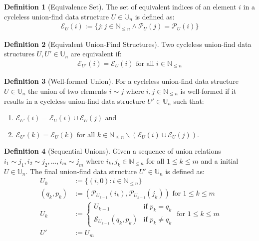 \documentclass[a4paper,12pt]{article}
\theoremstyle{definition}
\newtheorem{definition}{Definition}[section]
\begin{document}
\begin{definition}[Equivalence Set]
    The set of equivalent indices of an element $i$ in a cycleless union-find
    data structure $U \in \mathbb{U}_n$ is defined as:
    \begin{align*}
        \mathcal{E}_U(i) := \{j : j \in \mathbb{N}_{\leq n} \land \mathcal{P}_U(j) = \mathcal{P}_U(i)\}
    \end{align*}
\end{definition}

\begin{definition}[Equivalent Union-Find Structures]
    Two cycleless union-find data structures $U, U' \in \mathbb{U}_n$ are
    equivalent if:
    \begin{align*}
        \mathcal{E}_{U'}(i) = \mathcal{E}_U(i) \text{ for all } i \in \mathbb{N}_{\leq n}
    \end{align*}
\end{definition}

\begin{definition}[Well-formed Union]
    For a cycleless union-find data structure $U \in \mathbb{U}_n$ the union of
    two elements $i \sim j$ where $i, j \in \mathbb{N}_{\leq n}$ is well-formed
    if it results in a cycleless union-find data structure $U' \in \mathbb{U}_n$
    such that:
    \begin{enumerate}
        \item $\mathcal{E}_{U'}(i) = \mathcal{E}_U(i) \cup \mathcal{E}_U(j)$ and
        \item $\mathcal{E}_{U'}(k) = \mathcal{E}_U(k) \text{ for all } k \in
        \mathbb{N}_{\leq n} \backslash (\mathcal{E}_U(i) \cup \mathcal{E}_U(j))$.
    \end{enumerate}
\end{definition}

\begin{definition}[Sequential Unions]\label{def:sequential-unions}
    Given a sequence of union relations $i_1 \sim j_1, i_2 \sim j_2, \ldots, i_m
    \sim j_m$ where $i_k, j_k \in \mathbb{N}_{\leq n}$ for all $1 \leq k \leq m$
    and a initial  $U \in \mathbb{U}_n$. The final union-find data structure $U'
    \in \mathbb{U}_n$ is
    defined as:
    \begin{align*}
        U_0 &:= \{(i, 0) : i \in \mathbb{N}_{\leq n}\} \\
        (q_k, p_k) &:= (\mathcal{P}_{U_{k-1}}(i_k), \mathcal{P}_{U_{k-1}}(j_k)) \text{ for } 1 \leq k \leq m \\
        U_k &:= \begin{cases}
            U_{k-1} & \text{if } p_k = q_k \\
            \mathcal{S}_{U_{k-1}}(q_k, p_k) & \text{if } p_k \neq q_k
        \end{cases} \text{ for } 1 \leq k \leq m \\
        U' &:= U_m
    \end{align*}
\end{definition}
\end{document}
